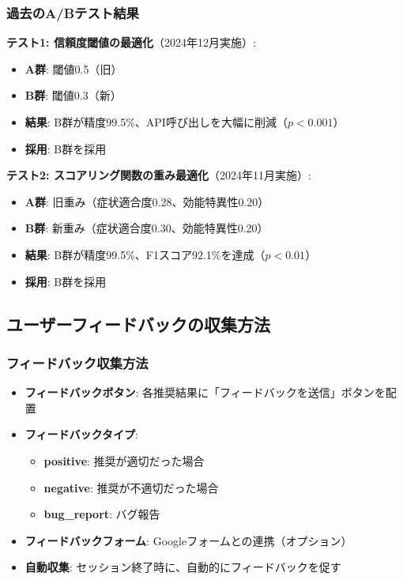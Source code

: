 \documentclass[a4paper,11pt,ja=standard,xelatex]{bxjsarticle}
\theoremstyle{definition}
\begin{document}
\subsubsection{過去のA/Bテスト結果}

\textbf{テスト1: 信頼度閾値の最適化}（2024年12月実施）:
\begin{itemize}
\item \textbf{A群}: 閾値0.5（旧）
\item \textbf{B群}: 閾値0.3（新）
\item \textbf{結果}: B群が精度99.5\%、API呼び出しを大幅に削減（$p < 0.001$）
\item \textbf{採用}: B群を採用
\end{itemize}

\textbf{テスト2: スコアリング関数の重み最適化}（2024年11月実施）:
\begin{itemize}
\item \textbf{A群}: 旧重み（症状適合度0.28、効能特異性0.20）
\item \textbf{B群}: 新重み（症状適合度0.30、効能特異性0.20）
\item \textbf{結果}: B群が精度99.5\%、F1スコア92.1\%を達成（$p < 0.01$）
\item \textbf{採用}: B群を採用
\end{itemize}

\subsection{ユーザーフィードバックの収集方法}

\subsubsection{フィードバック収集方法}

\begin{itemize}
\item \textbf{フィードバックボタン}: 各推奨結果に「フィードバックを送信」ボタンを配置
\item \textbf{フィードバックタイプ}: 
  \begin{itemize}
  \item \textbf{positive}: 推奨が適切だった場合
  \item \textbf{negative}: 推奨が不適切だった場合
  \item \textbf{bug\_report}: バグ報告
  \end{itemize}
\item \textbf{フィードバックフォーム}: Googleフォームとの連携（オプション）
\item \textbf{自動収集}: セッション終了時に、自動的にフィードバックを促す
\end{itemize}
\end{document}
